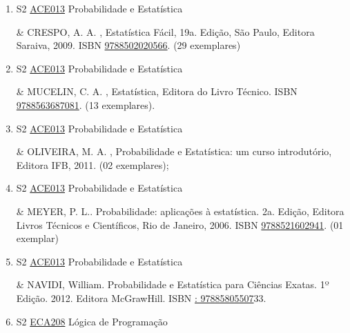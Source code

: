 \documentclass[12pt,a4paper]{book}
\begin{document}
\begin{enumerate}
& MAGALHÃES, M.  N. , Noções de Probabilidade e Estatística,7a.  ed, Editora Universidade de São Paulo, São Paulo, 2011.  (10 exemplares). 

 

 \item S2 \hyperref[PUD:ACE013]{ACE013} Probabilidade e Estatística

& CRESPO, A.  A. , Estatística Fácil, 19a.  Edição, São Paulo, Editora Saraiva, 2009.  ISBN \href{http://www.bn.br/site/pages/servicosProfissionais/agenciaISBN/isbnBusca/FbnBuscaISBNCatalogo.asp?pField=ISBN&pIntPagina=1&pISBN=02020566&nidbISBN=true&hidbISBN=true}{9788502020566}.  (29 exemplares) 

 

 \item S2 \hyperref[PUD:ACE013]{ACE013} Probabilidade e Estatística

& MUCELIN, C.  A. , Estatística, Editora do Livro Técnico.  ISBN \href{http://www.bn.br/site/pages/servicosProfissionais/agenciaISBN/isbnBusca/FbnBuscaISBNCatalogo.asp?pField=ISBN&pIntPagina=1&pISBN=63687081&nidbISBN=true&hidbISBN=true}{9788563687081}.  (13 exemplares).
 \item S2 \hyperref[PUD:ACE013]{ACE013} Probabilidade e Estatística

& OLIVEIRA, M.  A. , Probabilidade e Estatística: um curso introdutório, Editora IFB, 2011.  (02 exemplares); 

 

 \item S2 \hyperref[PUD:ACE013]{ACE013} Probabilidade e Estatística

& MEYER, P.  L..  Probabilidade: aplicações à estatística.  2a.  Edição, Editora Livros Técnicos e Científicos, Rio de Janeiro, 2006.  ISBN \href{http://www.bn.br/site/pages/servicosProfissionais/agenciaISBN/isbnBusca/FbnBuscaISBNCatalogo.asp?pField=ISBN&pIntPagina=1&pISBN=21602941&nidbISBN=true&hidbISBN=true}{9788521602941}.  (01 exemplar)

 

 \item S2 \hyperref[PUD:ACE013]{ACE013} Probabilidade e Estatística

&   NAVIDI, William.  Probabilidade e Estatística para Ciências Exatas.  1º Edição.  2012.  Editora McGrawHill.  ISBN \href{http://www.google.com/search?hl=pt-BR&tbo=p&tbm=bks&q=isbn:: 97885805507&num=10}{: 97885805507}33.
 \item S2 \hyperref[PUD:ECA208]{ECA208} Lógica de Programação


\end{enumerate}
\end{document}
